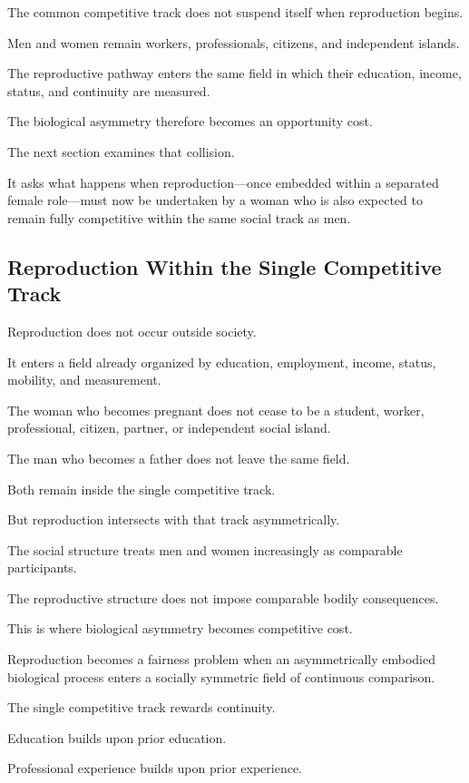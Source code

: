The common competitive track does not suspend itself when reproduction begins.

Men and women remain workers, professionals, citizens, and independent islands.

The reproductive pathway enters the same field in which their education, income, status, and continuity are measured.

The biological asymmetry therefore becomes an opportunity cost.

The next section examines that collision.

It asks what happens when reproduction—once embedded within a separated female role—must now be undertaken by a woman who is also expected to remain fully competitive within the same social track as men.

\subsection*{\textbf{Reproduction Within the Single Competitive Track}} 


Reproduction does not occur outside society.

It enters a field already organized by education, employment, income, status, mobility, and measurement.

The woman who becomes pregnant does not cease to be a student, worker, professional, citizen, partner, or independent social island.

The man who becomes a father does not leave the same field.

Both remain inside the single competitive track.

But reproduction intersects with that track asymmetrically.

The social structure treats men and women increasingly as comparable participants.

The reproductive structure does not impose comparable bodily consequences.

This is where biological asymmetry becomes competitive cost.

Reproduction becomes a fairness problem when an asymmetrically embodied biological process enters a socially symmetric field of continuous comparison.

The single competitive track rewards continuity.

Education builds upon prior education.

Professional experience builds upon prior experience.

